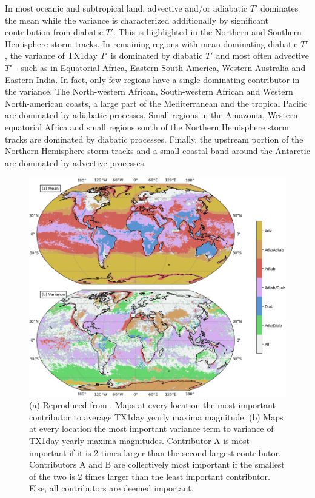 \documentclass[11pt,a4paper,twoside,openright]{report}
\theoremstyle{definition}
\begin{document}
In most oceanic and subtropical land, advective and/or adiabatic \(T'\) dominates the mean while the variance is characterized additionally by significant contribution from diabatic \(T'\). This is highlighted in the Northern and Southern Hemisphere storm tracks. In remaining regions with mean-dominating diabatic \(T'\), the variance of TX1day \(T'\) is dominated by diabatic \(T'\) and most often advective \(T'\) - such as in Equatorial Africa, Eastern South America, Western Australia and Eastern India. In fact, only few regions have a single dominating contributor in the variance. The North-western African, South-western African and Western North-american coasts, a large part of the Mediterranean and the tropical Pacific are dominated by adiabatic processes. Small regions in the Amazonia, Western equatorial Africa and small regions south of the Northern Hemisphere storm tracks are dominated by diabatic processes. Finally, the upstream portion of the Northern Hemisphere storm tracks and a small coastal band around the Antarctic are dominated by advective processes.

\begin{figure}[ht]
\includegraphics[width=1\linewidth]{images/dominant} \caption{(a) Reproduced from \cite{rothlisberger_quantifying_2023}. Maps at every location the most important contributor to average TX1day yearly maxima magnitude. (b) Maps at every location the most important variance term to variance of TX1day yearly maxima magnitudes. Contributor A is most important if it is 2 times larger than the second largest contributor. Contributors A and B are collectively most important if the smallest of the two is 2 times larger than the least important contributor. Else, all contributors are deemed important.}\label{fig:dominant}
\end{figure}
\end{document}
